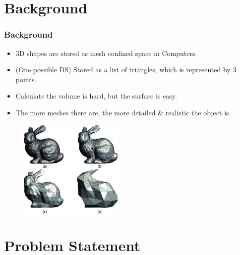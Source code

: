 \documentclass{beamer}
\begin{document}

\section{Background} %


\begin{frame}
	\frametitle{Background}
	\begin{itemize}
		\item 3D shapes are stored as mesh confined space in Computers.
		\item (One possible DS) Stored as a list of triangles, which is represented by 3 points.
		\item Calculate the volume is hard, but the surface is easy.
		\item The more meshes there are, the more detailed \& realistic the object is.
	\end{itemize}
	\begin{figure}
		\includegraphics[width=5cm]{imgs/rabbit.png}
	\end{figure}
\end{frame}


\section{Problem Statement} %
\end{document}
